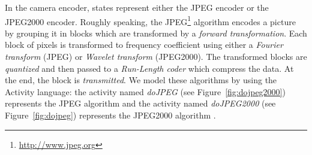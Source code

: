 	
In the camera encoder, states represent either the JPEG encoder or the JPEG2000 encoder. Roughly speaking, the JPEG\footnote{\url{http://www.jpeg.org}} algorithm encodes a picture by grouping it in blocks which are transformed by a \textit{forward transformation}. Each block of pixels is transformed to frequency coefficient using either a \textit{Fourier transform} (JPEG) or \textit{Wavelet transform} (JPEG2000). The transformed blocks are \textit{quantized} and then passed to a \textit{Run-Length coder} which compress the data. At the end, the block is \textit{transmitted}. We model these algorithms by using the Activity language: the activity named \emph{doJPEG} (see Figure~\ref{fig:dojpeg2000}) represents the JPEG algorithm and the activity named \emph{doJPEG2000} (see Figure~\ref{fig:dojpeg}) represents the JPEG2000 algorithm . 
	

